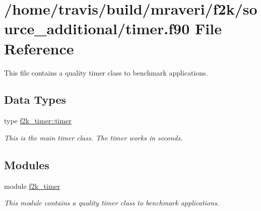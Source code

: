 \hypertarget{timer_8f90}{}\section{/home/travis/build/mraveri/f2k/source\+\_\+additional/timer.f90 File Reference}
\label{timer_8f90}


This file contains a quality timer class to benchmark applications.  


\subsection*{Data Types}
\begin{DoxyCompactItemize}
\item 
type \hyperlink{structf2k__timer_1_1timer}{f2k\+\_\+timer\+::timer}
\begin{DoxyCompactList}\small\item\em This is the main timer class. The timer works in seconds. \end{DoxyCompactList}\end{DoxyCompactItemize}
\subsection*{Modules}
\begin{DoxyCompactItemize}
\item 
module \hyperlink{namespacef2k__timer}{f2k\+\_\+timer}
\begin{DoxyCompactList}\small\item\em This module contains a quality timer class to benchmark applications. \end{DoxyCompactList}\end{DoxyCompactItemize}

